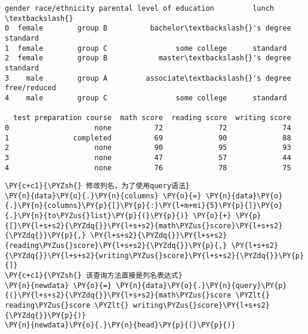             \begin{tcolorbox}[breakable, size=fbox, boxrule=.5pt, pad at break*=1mm, opacityfill=0]
\begin{Verbatim}[commandchars=\\\{\}]
   gender race/ethnicity parental level of education         lunch  \textbackslash{}
0  female        group B          bachelor\textbackslash{}'s degree      standard
1  female        group C                some college      standard
2  female        group B            master\textbackslash{}'s degree      standard
3    male        group A         associate\textbackslash{}'s degree  free/reduced
4    male        group C                some college      standard

  test preparation course  math score  reading score  writing score
0                    none          72             72             74
1               completed          69             90             88
2                    none          90             95             93
3                    none          47             57             44
4                    none          76             78             75
\end{Verbatim}
\end{tcolorbox}
        
    \begin{tcolorbox}[breakable, size=fbox, boxrule=1pt, pad at break*=1mm,colback=cellbackground, colframe=cellborder]
\begin{Verbatim}[commandchars=\\\{\}]
\PY{c+c1}{\PYZsh{} 修改列名，为了使用query语法}
\PY{n}{data}\PY{o}{.}\PY{n}{columns} \PY{o}{=} \PY{n}{data}\PY{o}{.}\PY{n}{columns}\PY{p}{[}\PY{p}{:}\PY{l+m+mi}{5}\PY{p}{]}\PY{o}{.}\PY{n}{to\PYZus{}list}\PY{p}{(}\PY{p}{)} \PY{o}{+} \PY{p}{[}\PY{l+s+s2}{\PYZdq{}}\PY{l+s+s2}{math\PYZus{}score}\PY{l+s+s2}{\PYZdq{}}\PY{p}{,} \PY{l+s+s2}{\PYZdq{}}\PY{l+s+s2}{reading\PYZus{}score}\PY{l+s+s2}{\PYZdq{}}\PY{p}{,} \PY{l+s+s2}{\PYZdq{}}\PY{l+s+s2}{writing\PYZus{}score}\PY{l+s+s2}{\PYZdq{}}\PY{p}{]}
\PY{c+c1}{\PYZsh{} 该查询方法直接是列名表达式}
\PY{n}{newdata} \PY{o}{=} \PY{n}{data}\PY{o}{.}\PY{n}{query}\PY{p}{(}\PY{l+s+s2}{\PYZdq{}}\PY{l+s+s2}{math\PYZus{}score \PYZlt{} reading\PYZus{}score \PYZlt{} writing\PYZus{}score}\PY{l+s+s2}{\PYZdq{}}\PY{p}{)}
\PY{n}{newdata}\PY{o}{.}\PY{n}{head}\PY{p}{(}\PY{p}{)}
\end{Verbatim}
\end{tcolorbox}

